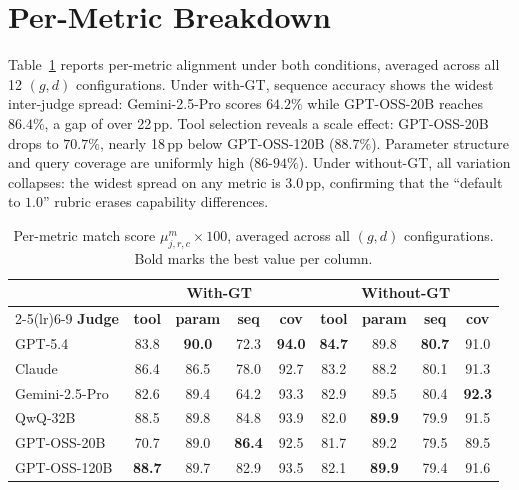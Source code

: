\section{Per-Metric Breakdown}
\label{app:permetric-table}

Table~\ref{tab:e4-permetric} reports per-metric alignment under both
conditions, averaged across all 12 $(g, d)$ configurations. Under with-GT,
sequence accuracy shows the widest inter-judge spread: Gemini-2.5-Pro
scores $64.2\%$ while GPT-OSS-20B reaches $86.4\%$, a gap of over 22\,pp.
Tool selection reveals a scale effect: GPT-OSS-20B drops to $70.7\%$,
nearly 18\,pp below GPT-OSS-120B ($88.7\%$). Parameter structure and query
coverage are uniformly high ($86$-$94\%$). Under without-GT, all variation
collapses: the widest spread on any metric is $3.0$\,pp, confirming that
the ``default to $1.0$'' rubric erases capability differences.

\begin{table}[!htbp]
\centering
\small
\setlength{\tabcolsep}{4pt}
\renewcommand{\arraystretch}{1.05}
\caption{Per-metric match score $\mu^{m}_{j,r,c} \times 100$, averaged
across all $(g,d)$ configurations. Bold marks the best value per column.}
\label{tab:e4-permetric}
\begin{tabular}{@{}lcccc|cccc@{}}
\toprule
 & \multicolumn{4}{c}{\textbf{With-GT}} & \multicolumn{4}{c}{\textbf{Without-GT}} \\
\cmidrule(lr){2-5}\cmidrule(lr){6-9}
\textbf{Judge}
  & \textbf{tool} & \textbf{param} & \textbf{seq} & \textbf{cov}
  & \textbf{tool} & \textbf{param} & \textbf{seq} & \textbf{cov} \\
\midrule
GPT-5.4         & 83.8          & \textbf{90.0} & 72.3          & \textbf{94.0} & \textbf{84.7} & 89.8 & \textbf{80.7} & 91.0          \\
Claude          & 86.4          & 86.5          & 78.0          & 92.7          & 83.2          & 88.2 & 80.1          & 91.3          \\
Gemini-2.5-Pro  & 82.6          & 89.4          & 64.2          & 93.3          & 82.9          & 89.5 & 80.4          & \textbf{92.3} \\
QwQ-32B         & 88.5          & 89.8          & 84.8          & 93.9          & 82.0          & \textbf{89.9} & 79.9 & 91.5          \\
GPT-OSS-20B     & 70.7          & 89.0          & \textbf{86.4} & 92.5          & 81.7          & 89.2 & 79.5          & 89.5          \\
GPT-OSS-120B    & \textbf{88.7} & 89.7          & 82.9          & 93.5          & 82.1          & \textbf{89.9} & 79.4 & 91.6          \\
\bottomrule
\end{tabular}
\end{table}


